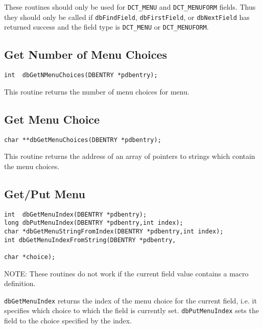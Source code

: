 These routines should only be used for \verb|DCT_MENU| and \verb|DCT_MENUFORM| fields.
Thus they should only be called if \verb|dbFindField|, \verb|dbFirstField|, or \verb|dbNextField| has returned success and the field type is \verb|DCT_MENU| or \verb|DCT_MENUFORM|.

\subsection{Get Number of Menu Choices}

\begin{verbatim}
int  dbGetNMenuChoices(DBENTRY *pdbentry);
\end{verbatim}

This routine returns the number of menu choices for menu.

\subsection{Get Menu Choice}

\begin{verbatim}
char **dbGetMenuChoices(DBENTRY *pdbentry);
\end{verbatim}

This routine returns the address of an array of pointers to strings which contain the menu choices.

\subsection{Get/Put Menu}

\begin{verbatim}
int  dbGetMenuIndex(DBENTRY *pdbentry);
long dbPutMenuIndex(DBENTRY *pdbentry,int index);
char *dbGetMenuStringFromIndex(DBENTRY *pdbentry,int index);
int dbGetMenuIndexFromString(DBENTRY *pdbentry,

char *choice);
\end{verbatim}

NOTE: These routines do not work if the current field value contains a macro definition.

\verb|dbGetMenuIndex| returns the index of the menu choice for the current field, i.e. it specifies which choice to which the 
field is currently set.
\verb|dbPutMenuIndex| sets the field to the choice specified by the index.

